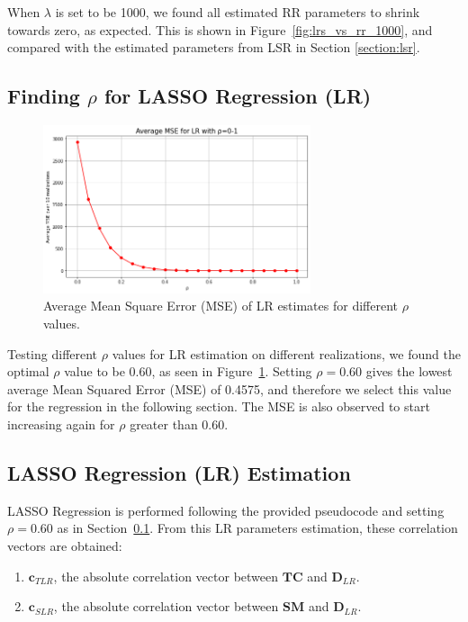 \documentclass[11pt]{article}
\def\*#1{\mathbf{#1}}
\begin{document}
When $\lambda$ is set to be 1000, we found all estimated RR parameters to shrink towards zero, as expected. This is shown in Figure~\ref{fig:lrs_vs_rr_1000}, and compared with the estimated parameters from LSR in Section \ref{section:lsr}.

\subsection{Finding $\rho$ for LASSO Regression (LR)}
\label{section:findp}

    \begin{figure}[H]
        \begin{center}
            \includegraphics[width=0.7\textwidth]{../plots/2_3_MSE_vs_rho_LR}
        \caption{Average Mean Square Error (MSE) of LR estimates for different $\rho$ values.}
        \label{fig:find_rho}
        \end{center}
    \end{figure}

Testing different $\rho$ values for LR estimation on different realizations, we found the optimal $\rho$ value to be 0.60, as seen in Figure~\ref{fig:find_rho}. Setting $\rho = 0.60$ gives the lowest average Mean Squared Error (MSE) of 0.4575, and therefore we select this value for the regression in the following section. The MSE is also observed to start increasing again for $\rho$ greater than 0.60.

\subsection{LASSO Regression (LR) Estimation}

LASSO Regression is performed following the provided pseudocode and setting $\rho = 0.60$ as in Section~\ref{section:findp}. From this LR parameters estimation, these correlation vectors are obtained:

\begin{enumerate}
    \item $\mathbf{c}_{TLR}$, the absolute correlation vector between $\*{TC}$ and $\*D_{LR}$.
    \item $\mathbf{c}_{SLR}$, the absolute correlation vector between $\*{SM}$ and $\*D_{LR}$.
\end{enumerate}
\end{document}
